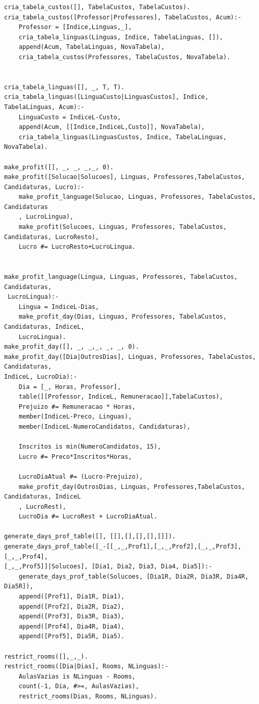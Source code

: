 \documentclass{llncs}
\begin{document}
\begin{verbatim}
cria_tabela_custos([], TabelaCustos, TabelaCustos).
cria_tabela_custos([Professor|Professores], TabelaCustos, Acum):-
	Professor = [Indice,Linguas,_],
	cria_tabela_linguas(Linguas, Indice, TabelaLinguas, []),
	append(Acum, TabelaLinguas, NovaTabela),
	cria_tabela_custos(Professores, TabelaCustos, NovaTabela).


cria_tabela_linguas([], _, T, T).
cria_tabela_linguas([LinguaCusto|LinguasCustos], Indice, TabelaLinguas, Acum):-
	LinguaCusto = IndiceL-Custo,
	append(Acum, [[Indice,IndiceL,Custo]], NovaTabela),
	cria_tabela_linguas(LinguasCustos, Indice, TabelaLinguas, NovaTabela).

make_profit([], _, _, _,_, 0).
make_profit([Solucao|Solucoes], Linguas, Professores,TabelaCustos, Candidaturas, Lucro):-
	make_profit_language(Solucao, Linguas, Professores, TabelaCustos, Candidaturas
	, LucroLingua),
	make_profit(Solucoes, Linguas, Professores, TabelaCustos, Candidaturas, LucroResto),
	Lucro #= LucroResto+LucroLingua.


make_profit_language(Lingua, Linguas, Professores, TabelaCustos, Candidaturas,
 LucroLingua):-
	Lingua = IndiceL-Dias,
	make_profit_day(Dias, Linguas, Professores, TabelaCustos, Candidaturas, IndiceL, 
	LucroLingua).
make_profit_day([], _, _,_, _, _, 0).
make_profit_day([Dia|OutrosDias], Linguas, Professores, TabelaCustos, Candidaturas, 
IndiceL, LucroDia):-
	Dia = [_, Horas, Professor],
	table([[Professor, IndiceL, Remuneracao]],TabelaCustos),
	Prejuizo #= Remuneracao * Horas,
	member(IndiceL-Preco, Linguas),
	member(IndiceL-NumeroCandidatos, Candidaturas),

	Inscritos is min(NumeroCandidatos, 15),
	Lucro #= Preco*Inscritos*Horas,

	LucroDiaAtual #= (Lucro-Prejuizo),
	make_profit_day(OutrosDias, Linguas, Professores,TabelaCustos, Candidaturas, IndiceL
	, LucroRest),
	LucroDia #= LucroRest + LucroDiaAtual.

generate_days_prof_table([], [[],[],[],[],[]]).
generate_days_prof_table([_-[[_,_,Prof1],[_,_,Prof2],[_,_,Prof3],[_,_,Prof4],
[_,_,Prof5]]|Solucoes], [Dia1, Dia2, Dia3, Dia4, Dia5]):-
	generate_days_prof_table(Solucoes, [Dia1R, Dia2R, Dia3R, Dia4R, Dia5R]),
	append([Prof1], Dia1R, Dia1),
	append([Prof2], Dia2R, Dia2),
	append([Prof3], Dia3R, Dia3),
	append([Prof4], Dia4R, Dia4),
	append([Prof5], Dia5R, Dia5).

restrict_rooms([],_,_).
restrict_rooms([Dia|Dias], Rooms, NLinguas):-
	AulasVazias is NLinguas - Rooms,
	count(-1, Dia, #>=, AulasVazias),
	restrict_rooms(Dias, Rooms, NLinguas).



\end{verbatim}
\end{document}
